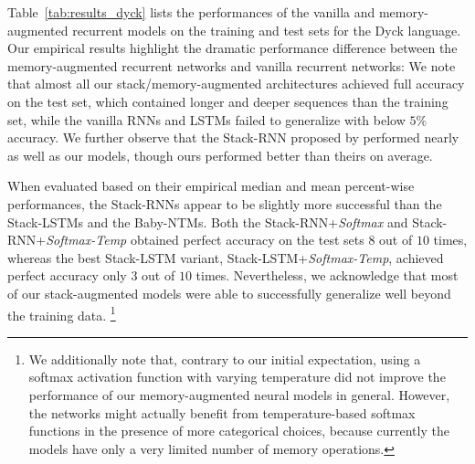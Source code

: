 \documentclass[11pt,a4paper]{article}
\theoremstyle{plain}
\begin{document}
Table~\ref{tab:results_dyck} lists the performances of the vanilla and memory-augmented recurrent models on the training and test sets for the Dyck language. Our empirical results highlight the dramatic performance difference between the memory-augmented recurrent networks and vanilla recurrent networks: We note that almost all our stack/memory-augmented architectures achieved full accuracy on the test set, which contained longer and deeper sequences than the training set, while the vanilla RNNs and LSTMs failed to generalize with below $5\%$ accuracy. We further observe that the Stack-RNN proposed by \citet{joulin2015inferring} performed nearly as well as our models, though ours performed better than theirs on average.

When evaluated based on their empirical median and mean percent-wise performances, the Stack-RNNs appear to be slightly more successful than the Stack-LSTMs and the Baby-NTMs. Both the Stack-RNN+\textit{Softmax} and Stack-RNN+\textit{Softmax-Temp} obtained perfect accuracy on the test sets $8$ out of $10$ times, whereas the best Stack-LSTM variant, Stack-LSTM+\textit{Softmax-Temp}, achieved perfect accuracy only $3$ out of $10$ times. Nevertheless, we acknowledge that most of our stack-augmented models were able to successfully generalize well beyond the training data. \footnote{We additionally note that, contrary to our initial expectation, using a softmax activation function with varying temperature did not improve the performance of our memory-augmented neural models in general. However, the networks might actually benefit from temperature-based softmax functions in the presence of more categorical choices, because currently the models have only a very limited number of memory operations.}
\end{document}
